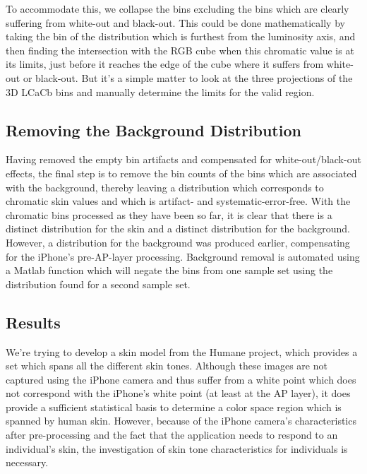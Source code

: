 To accommodate this, we collapse the bins excluding the bins which are clearly suffering from white-out and black-out. This could be done mathematically by taking the bin of the distribution which is furthest from the luminosity axis, and then finding the intersection with the RGB cube when this chromatic value is at its limits, just before it reaches the edge of the cube where it suffers from white-out or black-out. But it's a simple matter to look at the three projections of the 3D LCaCb bins and manually determine the limits for the valid region.


\subsection{Removing the Background Distribution}\label{sec:RemovingBGDistribution}

Having removed the empty bin artifacts and compensated for white-out/black-out effects, the final step is to remove the bin counts of the bins which are associated with the background, thereby leaving a distribution which corresponds to chromatic skin values and which is artifact- and systematic-error-free. With the chromatic bins processed as they have been so far, it is clear that there is a distinct distribution for the skin and a distinct distribution for the background. However, a distribution for the background was produced earlier, compensating for the iPhone's pre-AP-layer processing. Background removal is automated using a Matlab function which will negate the bins from one sample set using the distribution found for a second sample set.


\subsection{Results}\label{sec:Results}

We're trying to develop a skin model from the Humane project, which provides a set which spans all the different skin tones. Although these images are not captured using the iPhone camera and thus suffer from a white point which does not correspond with the iPhone's white point (at least at the AP layer), it does provide a sufficient statistical basis to determine a color space region which is spanned by human skin. However, because of the iPhone camera's characteristics after pre-processing and the fact that the application needs to respond to an individual's skin, the investigation of skin tone characteristics for individuals is necessary.

